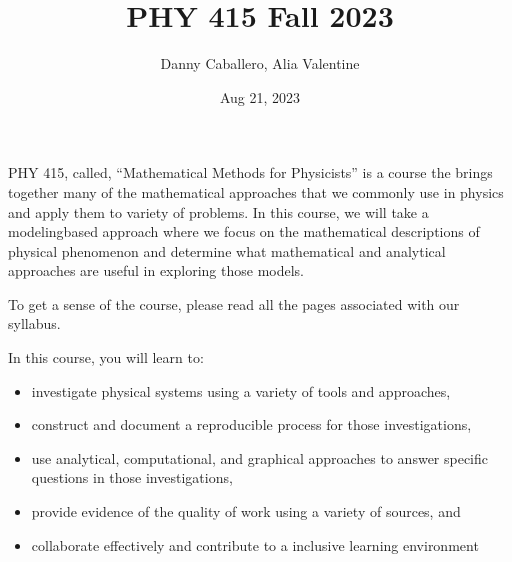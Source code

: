 \documentclass[letterpaper,10pt,english]{jupyterBook}
\title{PHY 415 Fall 2023}
\date{Aug 21, 2023}
\author{Danny Caballero, Alia Valentine}
\begin{document}
\pagestyle{empty}
\sphinxmaketitle
\pagestyle{plain}
\sphinxtableofcontents
\pagestyle{normal}
\label{\detokenize{content/intro::doc}}


\sphinxAtStartPar
PHY 415, called, “Mathematical Methods for Physicists” is a course the brings together many of the mathematical approaches that we commonly use in physics and apply them to variety of problems. In this course, we will take a modeling\sphinxhyphen{}based approach where we focus on the mathematical descriptions of physical phenomenon and determine what mathematical and analytical approaches are useful in exploring those models.

\sphinxAtStartPar
To get a sense of the course, please read all the pages associated with our syllabus.

\begin{DUlineblock}{0em}
\item[] 
\end{DUlineblock}

\sphinxAtStartPar
In this course, you will learn to:
\begin{itemize}
\item {} 
\sphinxAtStartPar
investigate physical systems using a variety of tools and approaches,

\item {} 
\sphinxAtStartPar
construct and document a reproducible process for those investigations,

\item {} 
\sphinxAtStartPar
use analytical, computational, and graphical approaches to answer specific questions in those investigations,

\item {} 
\sphinxAtStartPar
provide evidence of the quality of work using a variety of sources, and

\item {} 
\sphinxAtStartPar
collaborate effectively and contribute to a inclusive learning environment

\end{itemize}
\end{document}
